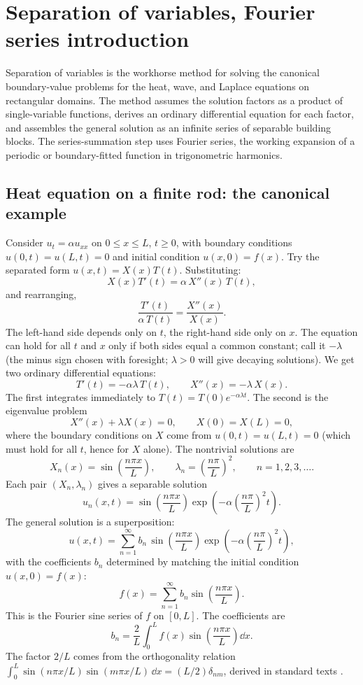 \section{Separation of variables, Fourier series introduction}

Separation of variables is the workhorse method for solving the
canonical boundary-value problems for the heat, wave, and Laplace
equations on rectangular domains. The method assumes the solution
factors as a product of single-variable functions, derives an
ordinary differential equation for each factor, and assembles the
general solution as an infinite series of separable building
blocks. The series-summation step uses Fourier series, the working
expansion of a periodic or boundary-fitted function in
trigonometric harmonics.

\subsection{Heat equation on a finite rod: the canonical example}

Consider $u_{t} = \alpha u_{xx}$ on $0 \leq x \leq L$, $t \geq 0$,
with boundary conditions $u(0, t) = u(L, t) = 0$ and initial
condition $u(x, 0) = f(x)$. Try the separated form $u(x, t) =
X(x) T(t)$. Substituting:
\[
X(x) T'(t) = \alpha\, X''(x)\, T(t),
\]
and rearranging,
\[
\frac{T'(t)}{\alpha\, T(t)} = \frac{X''(x)}{X(x)}.
\]
The left-hand side depends only on $t$, the right-hand side only
on $x$. The equation can hold for all $t$ and $x$ only if both
sides equal a common constant; call it $-\lambda$ (the minus sign
chosen with foresight; $\lambda > 0$ will give decaying solutions).
We get two ordinary differential equations:
\[
T'(t) = -\alpha \lambda\, T(t), \qquad X''(x) = -\lambda\, X(x).
\]
The first integrates immediately to $T(t) = T(0) e^{-\alpha \lambda
t}$. The second is the eigenvalue problem
\[
X''(x) + \lambda X(x) = 0, \qquad X(0) = X(L) = 0,
\]
where the boundary conditions on $X$ come from $u(0, t) = u(L, t)
= 0$ (which must hold for all $t$, hence for $X$ alone). The
nontrivial solutions are
\[
X_{n}(x) = \sin\!\left(\frac{n \pi x}{L}\right), \qquad \lambda_{n} = \left(\frac{n \pi}{L}\right)^{2}, \qquad n = 1, 2, 3, \ldots.
\]
Each pair $(X_{n}, \lambda_{n})$ gives a separable solution
\[
u_{n}(x, t) = \sin\!\left(\frac{n \pi x}{L}\right) \exp\!\left(-\alpha \left(\frac{n \pi}{L}\right)^{2} t\right).
\]
The general solution is a superposition:
\[
u(x, t) = \sum_{n = 1}^{\infty} b_{n}\, \sin\!\left(\frac{n \pi x}{L}\right) \exp\!\left(-\alpha \left(\frac{n \pi}{L}\right)^{2} t\right),
\]
with the coefficients $b_{n}$ determined by matching the initial
condition $u(x, 0) = f(x)$:
\[
f(x) = \sum_{n = 1}^{\infty} b_{n} \sin\!\left(\frac{n \pi x}{L}\right).
\]
This is the Fourier sine series of $f$ on $[0, L]$. The
coefficients are
\[
b_{n} = \frac{2}{L} \int_{0}^{L} f(x) \sin\!\left(\frac{n \pi x}{L}\right) \dd x.
\]
The factor $2/L$ comes from the orthogonality relation
$\int_{0}^{L} \sin(n\pi x/L) \sin(m\pi x/L)\, \dd x = (L/2)
\delta_{nm}$, derived in standard texts \cite{text:strang2016}.

